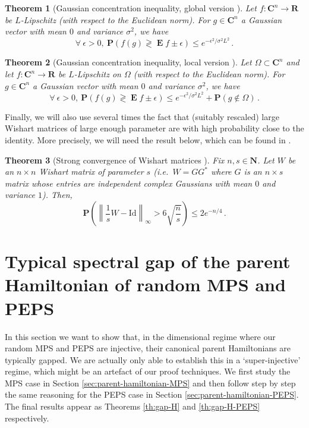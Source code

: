 \documentclass{amsart}
\newtheorem{theorem}{Theorem}[section]
\newcommand{\N}{\mathbf{N}}
\newcommand{\R}{\mathbf{R}}
\newcommand{\C}{\mathbf{C}}
\renewcommand{\P}{\mathbf{P}}
\renewcommand{\leq}{\leqslant}
\newcommand{\Id}{\mathrm{Id}}
\DeclareMathOperator{\E}{\mathbf{E}}
\begin{document}
\begin{theorem}[Gaussian concentration inequality, global version \cite{Bor,ST}] \label{th:g-global}
    Let $f:\C^n\longrightarrow\R$ be $L$-Lipschitz (with respect to the Euclidean norm). For $g\in\C^n$ a Gaussian vector with mean $0$ and variance $\sigma^2$, we have
    \[ \forall\ \epsilon>0,\ \P( f(g) \gtrless \E f \pm \epsilon) \leq e^{-\epsilon^2/\sigma^2L^2} \, . \]
\end{theorem}

\begin{theorem}[Gaussian concentration inequality, local version \cite{ASW}] \label{th:g-local}
    Let $\Omega\subset\C^n$ and let $f:\C^n\longrightarrow\R$ be $L$-Lipschitz on $\Omega$ (with respect to the Euclidean norm). For $g\in\C^n$ a Gaussian vector with mean $0$ and variance $\sigma^2$, we have
    \[  \forall\ \epsilon>0,\ \P( f(g) \gtrless \E f \pm \epsilon) \leq e^{-\epsilon^2/\sigma^2L^2} + \P(g\notin\Omega) \, . \]
\end{theorem}

Finally, we will also use several times the fact that (suitably rescaled) large Wishart matrices of large enough parameter are with high probability close to the identity. More precisely, we will need the result below, which can be found in \cite[Proposition 6.33]{AS}.

\begin{theorem}[Strong convergence of Wishart matrices \cite{AS}] \label{th:Wishart}
    Fix $n,s\in\N$. Let $W$ be an $n\times n$ Wishart matrix of parameter $s$ (i.e.~$W=GG^*$ where $G$ is an $n\times s$ matrix whose entries are independent complex Gaussians with mean $0$ and variance $1$). Then,
    \[ \P\left( \left\|\frac{1}{s}W-\Id\right\|_{\infty} > 6\sqrt{\frac{n}{s}} \right) \leq 2e^{-n/4} \, . \]
\end{theorem}


\section{Typical spectral gap of the parent Hamiltonian of random MPS and PEPS}
\label{sec:parent-hamiltonian}

In this section we want to show that, in the dimensional regime where our random MPS and PEPS are injective, their canonical parent Hamiltonians are typically gapped. We are actually only able to establish this in a `super-injective' regime, which might be an artefact of our proof techniques. We first study the MPS case in Section \ref{sec:parent-hamiltonian-MPS} and then follow step by step the same reasoning for the PEPS case in Section \ref{sec:parent-hamiltonian-PEPS}. The final results appear as Theorems \ref{th:gap-H} and \ref{th:gap-H-PEPS} respectively.
\end{document}
